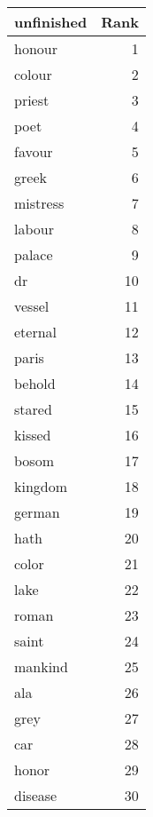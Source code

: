 \begin{table}
\label{tab:unfinished_terms}
\begin{tabular}{lr}
\toprule
unfinished & Rank \\
\midrule
honour & 1 \\
colour & 2 \\
priest & 3 \\
poet & 4 \\
favour & 5 \\
greek & 6 \\
mistress & 7 \\
labour & 8 \\
palace & 9 \\
dr & 10 \\
vessel & 11 \\
eternal & 12 \\
paris & 13 \\
behold & 14 \\
stared & 15 \\
kissed & 16 \\
bosom & 17 \\
kingdom & 18 \\
german & 19 \\
hath & 20 \\
color & 21 \\
lake & 22 \\
roman & 23 \\
saint & 24 \\
mankind & 25 \\
ala & 26 \\
grey & 27 \\
car & 28 \\
honor & 29 \\
disease & 30 \\
\bottomrule
\end{tabular}
\end{table}
